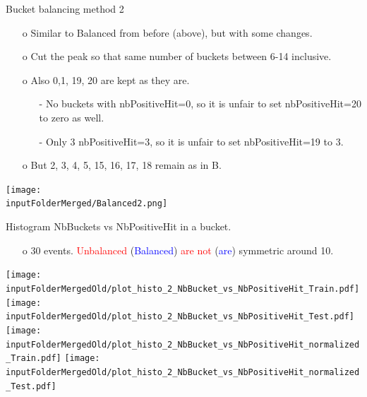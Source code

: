 \documentclass{beamer}
\begin{document}
\begin{frame}{Bucket balancing method 2}
\begin{enumerate}
\item[o] Similar to Balanced from before (above), but with some changes.
\item[o] Cut the peak so that same number of buckets between 6-14 inclusive.
\item[o] Also 0,1, 19, 20 are kept as they are. 
\begin{enumerate}
\item[-] No buckets with nbPositiveHit=0, so it is unfair to set nbPositiveHit=20 to zero as well.
\item[-] Only 3 nbPositiveHit=3, so it is unfair to set nbPositiveHit=19 to 3.
\end{enumerate}
\item[o] But 2, 3, 4, 5, 15, 16, 17, 18 remain as in B. 
\end{enumerate}
\centering
\texttt{[image: \\inputFolderMerged/Balanced2.png]}
\end{frame}



\begin{frame}{Histogram NbBuckets vs NbPositiveHit in a bucket.}
\begin{enumerate}
\item[o] 30 events. \textcolor{red}{Unbalanced} (\textcolor{blue}{Balanced})  \textcolor{red}{are not} (\textcolor{blue}{are}) symmetric around 10. 
\end{enumerate}
\centering
\texttt{[image: \\inputFolderMergedOld/plot\_histo\_2\_NbBucket\_vs\_NbPositiveHit\_Train.pdf]}
\texttt{[image: \\inputFolderMergedOld/plot\_histo\_2\_NbBucket\_vs\_NbPositiveHit\_Test.pdf]}\\
\texttt{[image: \\inputFolderMergedOld/plot\_histo\_2\_NbBucket\_vs\_NbPositiveHit\_normalized\_Train.pdf]}
\texttt{[image: \\inputFolderMergedOld/plot\_histo\_2\_NbBucket\_vs\_NbPositiveHit\_normalized\_Test.pdf]}\\
\end{frame}
\end{document}
